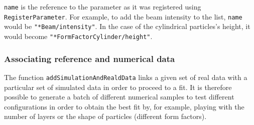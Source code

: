\texttt{name} is the reference to the parameter as it was registered
using \texttt{RegisterParameter}. For example, to add the beam
intensity to the list, \texttt{name} would be
\texttt{"*Beam/intensity"}. In the case of the cylindrical particles's
 height, it would become \texttt{"*FormFactorCylinder/height"}.\\



\subsubsection{Associating reference and numerical data}
The function \texttt{addSimulationAndRealdData} links a given set of real data with a
  particular set of simulated data in order to proceed to a fit. It is
  therefore possible to generate a batch of different numerical
  samples to test different configurations in order to obtain the best
  fit by, for example, playing with the number of layers or the shape of particles
  (different form factors). 

